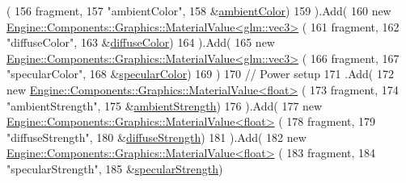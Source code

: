 \begin{DoxyCode}
      (
156                         fragment,
157                         \textcolor{stringliteral}{"ambientColor"},
158                         &\mbox{\hyperlink{classApplication_1_1Engines_1_1LightEngine_ab22b7d03d1c3cd19214474fb56bdd2ee}{ambientColor}})
159                 ).Add(
160                     \textcolor{keyword}{new} \mbox{\hyperlink{classEngine_1_1Components_1_1Graphics_1_1MaterialValue}{Engine::Components::Graphics::MaterialValue<glm::vec3>}}
      (
161                         fragment,
162                         \textcolor{stringliteral}{"diffuseColor"},
163                         &\mbox{\hyperlink{classApplication_1_1Engines_1_1LightEngine_a2247de4ba43b8d0e159ab90edd581363}{diffuseColor}})
164                 ).Add(
165                     \textcolor{keyword}{new} \mbox{\hyperlink{classEngine_1_1Components_1_1Graphics_1_1MaterialValue}{Engine::Components::Graphics::MaterialValue<glm::vec3>}}
      (
166                         fragment,
167                         \textcolor{stringliteral}{"specularColor"},
168                         &\mbox{\hyperlink{classApplication_1_1Engines_1_1LightEngine_ae03347f7ed935e951726dffba52d0fef}{specularColor}})
169                 )
170                 \textcolor{comment}{// Power setup}
171                 .Add(
172                     \textcolor{keyword}{new} \mbox{\hyperlink{classEngine_1_1Components_1_1Graphics_1_1MaterialValue}{Engine::Components::Graphics::MaterialValue<float>}}
      (
173                         fragment,
174                         \textcolor{stringliteral}{"ambientStrength"},
175                         &\mbox{\hyperlink{classApplication_1_1Engines_1_1LightEngine_af97d743158c0e55c754b455e7066e6b0}{ambientStrength}})
176                 ).Add(
177                     \textcolor{keyword}{new} \mbox{\hyperlink{classEngine_1_1Components_1_1Graphics_1_1MaterialValue}{Engine::Components::Graphics::MaterialValue<float>}}
      (
178                         fragment,
179                         \textcolor{stringliteral}{"diffuseStrength"},
180                         &\mbox{\hyperlink{classApplication_1_1Engines_1_1LightEngine_ab2f3fb68d22dd1e6386833f4790a8eb6}{diffuseStrength}})
181                 ).Add(
182                     \textcolor{keyword}{new} \mbox{\hyperlink{classEngine_1_1Components_1_1Graphics_1_1MaterialValue}{Engine::Components::Graphics::MaterialValue<float>}}
      (
183                         fragment,
184                         \textcolor{stringliteral}{"specularStrength"},
185                         &\mbox{\hyperlink{classApplication_1_1Engines_1_1LightEngine_a97dc7516071da727bcbb137e0cb75301}{specularStrength}})

\end{DoxyCode}
